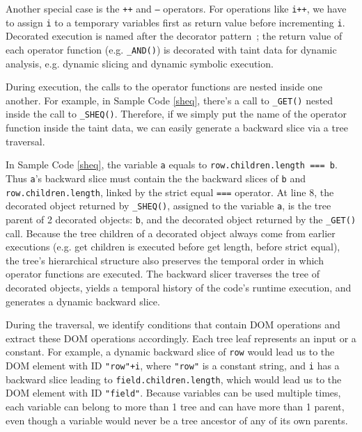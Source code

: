 Another special case is the {\tt ++} and {\tt --} operators.  For operations like {\tt i++}, we have to assign {\tt i} to a temporary variables first as return value before incrementing {\tt i}.
Decorated execution is named after the decorator pattern~\cite{decoratorPattern}; the return value of each operator function (e.g. {\tt \_AND()}) is decorated with taint data for dynamic analysis, e.g. dynamic slicing and dynamic symbolic execution.  


During execution, the calls to the operator functions are nested inside one another.  For example, in Sample Code \ref{sheq}, there's a call to {\tt \_GET()} nested inside the call to {\tt \_SHEQ()}.  
Therefore, if we simply put the name of the operator function inside the taint data, we can easily generate a backward slice via a tree traversal.  

In Sample Code \ref{sheq}, the variable {\tt a} equals to {\tt row.children.length === b}.  Thus {\tt a}'s backward slice must contain the the backward slices of {\tt b} and {\tt row.children.length}, linked by the strict equal {\tt ===} operator.  
At line 8, the decorated object returned by {\tt \_SHEQ()}, assigned to the variable {\tt a}, is the tree parent of 2 decorated objects: {\tt b}, and the decorated object returned by the {\tt \_GET()} call.  
Because the tree children of a decorated object always come from earlier executions (e.g. get children is executed before get length, before strict equal), the tree's hierarchical structure also preserves the temporal order in which operator functions are executed.  
The backward slicer traverses the tree of decorated objects, yields a temporal history of the code's runtime execution, and generates a dynamic backward slice.  

During the traversal, we identify conditions that contain DOM operations and extract these DOM operations accordingly.  Each tree leaf represents an input or a constant.  
For example, a dynamic backward slice of {\tt row} would lead us to the DOM element with ID {\tt "row"+i}, where {\tt "row"} is a constant string, and {\tt i} has a backward slice leading to {\tt field.children.length}, which would lead us to the DOM element with ID {\tt "field"}.  
Because variables can be used multiple times, each variable can belong to more than 1 tree and can have more than 1 parent, even though a variable would never be a tree ancestor of any of its own parents.  


